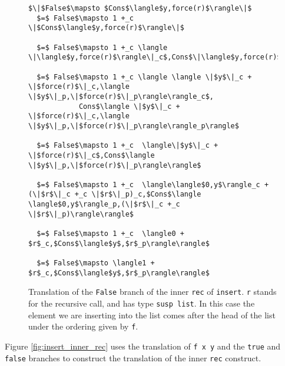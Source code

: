 \documentclass[12pt,letterpaper]{article}
\newcommand{\T}[1]{\texttt{#1}}
\begin{document}
\begin{figure}[H]
\caption{Translation of the \T{False} branch of the inner \T{rec} of \T{insert}.
\label{fig:insert_false}
\T{r} stands for the recursive call, and has type \T{susp list}.
In this case the element we are inserting into the list comes after the head of the list under the ordering given by \T{f}.
}
\begin{lstlisting}
$\|$False$\mapsto $Cons$\langle$y,force(r)$\rangle\|$
  $=$ False$\mapsto 1 +_c \|$Cons$\langle$y,force(r)$\rangle\|$

  $=$ False$\mapsto 1 +_c \langle \|\langle$y,force(r)$\rangle\|_c$,Cons$\|\langle$y,force(r)$\rangle\|_p\rangle$

  $=$ False$\mapsto 1 +_c \langle \langle \|$y$\|_c + \|$force(r)$\|_c,\langle \|$y$\|_p,\|$force(r)$\|_p\rangle\rangle_c$,
            Cons$\langle \|$y$\|_c + \|$force(r)$\|_c,\langle \|$y$\|_p,\|$force(r)$\|_p\rangle\rangle_p\rangle$

  $=$ False$\mapsto 1 +_c  \langle\|$y$\|_c + \|$force(r)$\|_c$,Cons$\langle \|$y$\|_p,\|$force(r)$\|_p\rangle\rangle$

  $=$ False$\mapsto 1 +_c  \langle\langle$0,y$\rangle_c + (\|$r$\|_c +_c \|$r$\|_p)_c,$Cons$\langle \langle$0,y$\rangle_p,(\|$r$\|_c +_c \|$r$\|_p)\rangle\rangle$

  $=$ False$\mapsto 1 +_c  \langle0 + $r$_c,$Cons$\langle$y$,$r$_p\rangle\rangle$

  $=$ False$\mapsto \langle1 + $r$_c,$Cons$\langle$y$,$r$_p\rangle\rangle$
\end{lstlisting}
\end{figure}

Figure \ref{fig:insert_inner_rec} uses the translation of \T{f x y} and the \T{true} and \T{false} branches to construct the translation of the inner \T{rec} construct.
\end{document}
